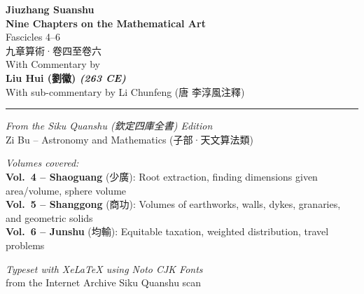 \documentclass[11pt,a4paper]{article}
\newcommand{\zh}[1]{#1}
\newcommand{\shortline}{\noindent\rule{0.5\textwidth}{0.4pt}\par}
\begin{document}
\begin{titlepage}
\begin{center}
\vspace*{2cm}

{\Huge\bfseries\color{titlecolor} Jiuzhang Suanshu\\[0.5em]
\Large Nine Chapters on the Mathematical Art}\\[2em]

{\LARGE\color{sectioncolor} Fascicles 4--6}\\[2em]

{\Large\color{volcolor}
\zh{九章算術·卷四至卷六}}\\[3em]

{\large With Commentary by}\\[0.5em]
{\Large\bfseries Liu Hui \zh{(劉徽)} \textit{(263 CE)}}\\[0.3em]
{\normalsize With sub-commentary by Li Chunfeng \zh{(唐 李淳風注釋)}}\\[2em]

\shortline

\vspace{1cm}

{\large\itshape From the Siku Quanshu \zh{(欽定四庫全書)} Edition}\\[0.5em]
{\normalsize Zi Bu -- Astronomy and Mathematics \zh{(子部·天文算法類)}}\\[2em]

\vfill

\begin{minipage}{0.85\textwidth}
\centering
\textit{Volumes covered:}\\[0.5em]
\textbf{Vol.\ 4 -- Shaoguang} (\zh{少廣}): Root extraction, finding dimensions given area/volume, sphere volume\\[0.3em]
\textbf{Vol.\ 5 -- Shanggong} (\zh{商功}): Volumes of earthworks, walls, dykes, granaries, and geometric solids\\[0.3em]
\textbf{Vol.\ 6 -- Junshu} (\zh{均輸}): Equitable taxation, weighted distribution, travel problems
\end{minipage}

\vspace{2cm}

{\small\textit{Typeset with XeLaTeX using Noto CJK Fonts}}\\
{\small from the Internet Archive Siku Quanshu scan}

\end{center}
\end{titlepage}
\end{document}
